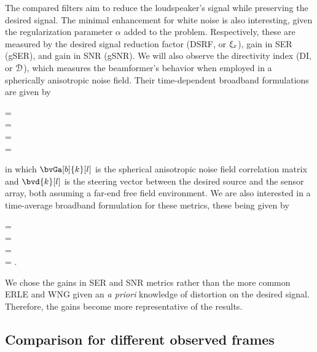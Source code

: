 The compared filters aim to reduce the loudspeaker's signal while preserving the desired signal. The minimal enhancement for white noise is also interesting, given the regularization parameter $\alpha$ added to the problem. Respectively, these are measured by the desired signal reduction factor (DSRF, or $\xi_{x}$), gain in SER (gSER), and gain in SNR (gSNR). We will also observe the directivity index (DI, or $\mathcal{D}$), which measures the beamformer's behavior when employed in a spherically anisotropic noise field. Their time-dependent broadband formulations are given by
\begin{subgather}
	\dsrf[l] =  \\
	\gser[l] =  \cdot {}\\
	\gsnr[l] =  \cdot {} \\
	\di[l] = 
\end{subgather}
in which $\bvGa[b]{k}[l]$ is the spherical anisotropic noise field correlation matrix \cite{habets_generating_2007} and $\bvd{k}[l]$ is the steering vector between the desired source and the sensor array, both assuming a far-end free field environment. We are also interested in a time-average broadband formulation for these metrics, these being given by
\begin{subgather}
	\dsrf =  \\
	\gser =  \cdot {} \\
	\gsnr =  \cdot {} \\
	\di = .
\end{subgather}
We chose the gains in SER and SNR metrics rather than the more common ERLE and WNG \cite{wada_enhancement_2012} given an \textit{a priori} knowledge of distortion on the desired signal. Therefore, the gains become more representative of the results.

\subsection{Comparison for different observed frames}

